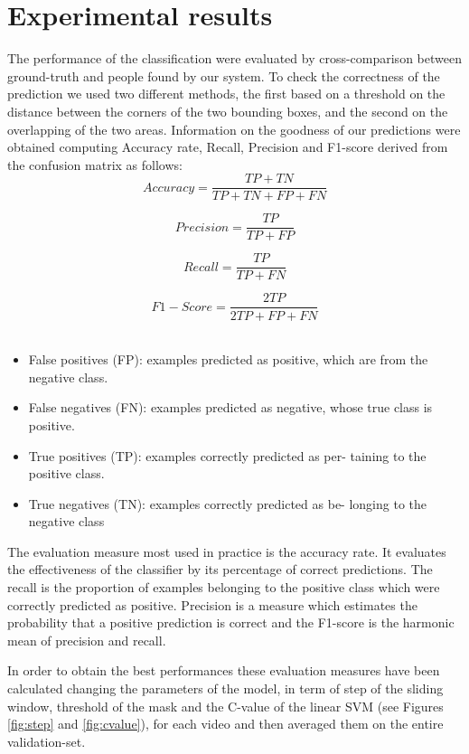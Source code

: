 \documentclass[a4paper,letterpaper, 11pt, onecolumn]{article} %
\begin{document}
\section{Experimental results}\label{results}
The performance of the classification were evaluated by cross-comparison between ground-truth and people found by our system. To check the correctness of the prediction we used two different methods, the first based on a threshold on the distance between the corners of the two bounding boxes, and the second on the overlapping of the two areas. Information on the goodness of our predictions were obtained computing Accuracy rate, Recall, Precision and F1-score derived from the confusion matrix as follows:
\\
$$Accuracy = \frac{TP + TN}{TP + TN + FP + FN}$$

$$Precision = \frac{TP}{TP + FP}$$

$$Recall = \frac{TP}{TP + FN}$$

$$F1-Score = \frac {2 TP}{2 TP + FP + FN}$$
\\
\begin{itemize}
\item False  positives  (FP):  examples  predicted  as  positive,
which are from the negative class.

\item False  negatives  (FN):  examples  predicted  as  negative,
whose true class is positive.

\item True positives (TP): examples correctly predicted as per-
taining to the positive class.

\item True negatives (TN): examples correctly predicted as be-
longing to the negative class
\end{itemize}

The  evaluation  measure  most  used  in  practice  is  the accuracy  rate. It  evaluates  the  effectiveness  of  the classifier by its percentage of correct predictions. The recall is the proportion of examples belonging to the positive  class  which  were  correctly  predicted  as  positive. Precision is a measure which estimates the probability that a positive prediction is correct and the F1-score is the harmonic mean of precision and recall.

In order to obtain the best performances these evaluation measures have been calculated changing the parameters of the model, in term of step of the sliding window, threshold of the mask and the C-value of the linear SVM (see Figures \ref{fig:step} and \ref{fig:cvalue}), for each video and then averaged them on the entire validation-set.
\end{document}
